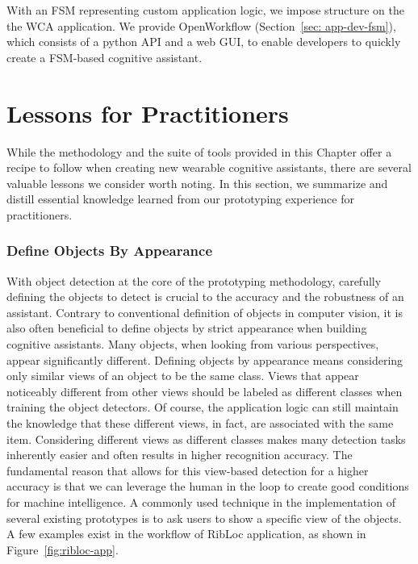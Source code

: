 With an FSM representing custom application logic, we impose structure on the
the WCA application. We provide OpenWorkflow (Section~\ref{sec: app-dev-fsm}),
which consists of a python API and a web GUI, to enable developers to quickly
create a FSM-based cognitive assistant.




\section{Lessons for Practitioners}

While the methodology and the suite of tools provided in this Chapter offer a
recipe to follow when creating new wearable cognitive assistants, there are
several valuable lessons we consider worth noting. In this section, we summarize
and distill essential knowledge learned from our prototyping experience for
practitioners.

\subsubsection{Define Objects By Appearance}

With object detection at the core of the prototyping methodology, carefully
defining the objects to detect is crucial to the accuracy and the robustness of
an assistant. Contrary to conventional definition of objects in computer vision,
it is also often beneficial to define objects by strict appearance when building
cognitive assistants. Many objects, when looking from various perspectives,
appear significantly different. Defining objects by appearance means considering
only similar views of an object to be the same class. Views that appear
noticeably different from other views should be labeled as different classes
when training the object detectors. Of course, the application logic can still
maintain the knowledge that these different views, in fact, are associated with
the same item. Considering different views as different classes makes many
detection tasks inherently easier and often results in higher recognition
accuracy. The fundamental reason that allows for this view-based detection for a
higher accuracy is that we can leverage the human in the loop to create good
conditions for machine intelligence. A commonly used technique in the
implementation of several existing prototypes is to ask users to show a specific
view of the objects. A few examples exist in the workflow of RibLoc application,
as shown in Figure~\ref{fig:ribloc-app}.

